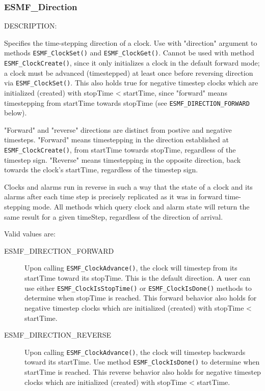 
\subsubsection{ESMF\_Direction}

{\sf DESCRIPTION:\\}
\begin{sloppypar}
Specifies the time-stepping direction of a clock.  Use with "direction"
argument to methods {\tt ESMF\_ClockSet()} and {\tt ESMF\_ClockGet()}.
Cannot be used with method {\tt ESMF\_ClockCreate()}, since it only
initializes a clock in the default forward mode; a clock must be advanced
(timestepped) at least once before reversing direction via
{\tt ESMF\_ClockSet()}.  This also holds true for negative timestep clocks
which are initialized (created) with stopTime < startTime, since "forward"
means timestepping from startTime towards stopTime
(see {\tt ESMF\_DIRECTION\_FORWARD} below).
\end{sloppypar}

"Forward" and "reverse" directions are distinct from postive and negative
timesteps.  "Forward" means timestepping in the direction established at
{\tt ESMF\_ClockCreate()}, from startTime towards stopTime, regardless
of the timestep sign.  "Reverse" means timestepping in the opposite direction,
back towards the clock's startTime, regardless of the timestep sign.

Clocks and alarms run in reverse in such a way that the state of a clock and
its alarms after each time step is precisely replicated as it was in forward
time-stepping mode.  All methods which query clock and alarm state will
return the same result for a given timeStep, regardless of the direction of
arrival.

Valid values are:
\begin{description}

\item [ESMF\_DIRECTION\_FORWARD] 
      Upon calling {\tt ESMF\_ClockAdvance()}, the clock will timestep from
its startTime toward its stopTime.  This is the default direction.  A user
can use either {\tt ESMF\_ClockIsStopTime()} or {\tt ESMF\_ClockIsDone()}
methods to determine when stopTime is reached.  This forward behavior also
holds for negative timestep clocks which are initialized (created) with
stopTime < startTime.

\item [ESMF\_DIRECTION\_REVERSE] 
      Upon calling {\tt ESMF\_ClockAdvance()}, the clock will timestep backwards
toward its startTime.  Use method {\tt ESMF\_ClockIsDone()} to determine when
startTime is reached.  This reverse behavior also holds for negative timestep
clocks which are initialized (created) with stopTime < startTime.

\end{description}


